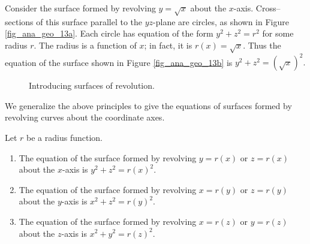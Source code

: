 Consider the surface formed by revolving $y=\sqrt{x}$ about the $x$-axis. Cross--sections of this surface parallel to the $yz$-plane are circles, as shown in Figure \ref{fig_ana_geo_13a}. Each circle has equation of the form $y^2+z^2=r^2$ for some radius $r$. The radius is a function of $x$; in fact, it is $r(x) = \sqrt{x}$. Thus the equation of the surface shown in Figure \ref{fig_ana_geo_13b} is $y^2+z^2=(\sqrt{x})^2.$

\begin{figure}[H]
\centering
\centerline{
\hspace{0.1cm}
}
\caption{Introducing surfaces of revolution.}
\end{figure}


We generalize the above principles to give the equations of surfaces formed by revolving curves about the coordinate axes.

\begin{definition}\label{idea:surf_of_revol}
Let $r$ be a radius function. 
\begin{enumerate}[align=left]
	\item The equation of the surface formed by revolving $y=r(x)$ or $z=r(x)$ about the $x$-axis is $y^2+z^2=r(x)^2$.
	\item The equation of the surface formed by revolving $x=r(y)$ or $z=r(y)$ about the $y$-axis is $x^2+z^2=r(y)^2$.
	\item The equation of the surface formed by revolving $x=r(z)$ or $y=r(z)$ about the $z$-axis is $x^2+y^2=r(z)^2$.
\end{enumerate}
\end{definition}

